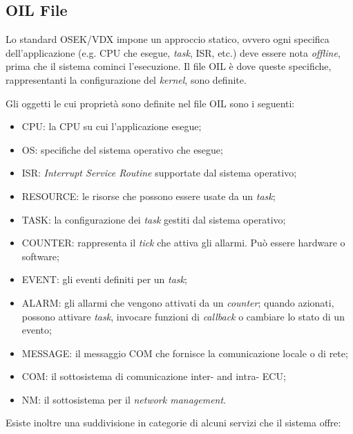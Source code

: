 \documentclass{article}
\begin{document}
\subsection{OIL File}
Lo standard OSEK/VDX impone un approccio statico, ovvero ogni specifica dell'applicazione (e.g. CPU che esegue, \textit{task}, ISR, etc.) deve essere nota \textit{offline}, prima che il sistema cominci l'esecuzione. Il file OIL è dove queste specifiche, rappresentanti la configurazione del \textit{kernel}, sono definite.

Gli oggetti le cui proprietà sono definite nel file OIL sono i seguenti:
\begin{itemize}
	\item CPU: la CPU su cui l'applicazione esegue;
	\item OS: specifiche del sistema operativo che esegue;
	\item ISR: \textit{Interrupt Service Routine} supportate dal sistema operativo;
	\item RESOURCE: le risorse che possono essere usate da un \textit{task};
	\item TASK: la configurazione dei \textit{task} gestiti dal sistema operativo;
	\item COUNTER: rappresenta il \textit{tick} che attiva gli allarmi. Può essere hardware o software;
	\item EVENT: gli eventi definiti per un \textit{task};
	\item  ALARM: gli allarmi che vengono attivati da un \textit{counter}; quando azionati, possono attivare \textit{task}, invocare funzioni di \textit{callback} o cambiare lo stato di un evento;
	\item MESSAGE: il messaggio COM che fornisce la comunicazione locale o di rete;
	\item COM: il sottosistema di comunicazione inter- and intra- ECU;
	\item NM: il sottosistema per il \textit{network management}.
\end{itemize}
Esiste inoltre una suddivisione in categorie di alcuni servizi che il sistema offre:
\end{document}

